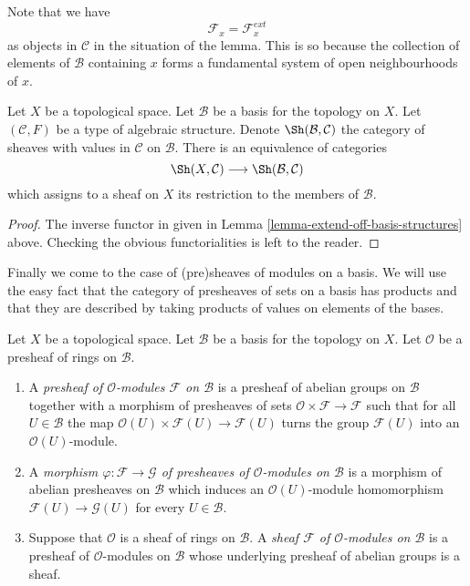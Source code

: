 \noindent
Note that we have
$$
\mathcal{F}_x = \mathcal{F}_x^{ext}
$$
as objects in $\mathcal{C}$
in the situation of the lemma. This is so because the
collection of elements of $\mathcal{B}$ containing
$x$ forms a fundamental system of open neighbourhoods of $x$.

\begin{lemma}
\label{lemma-restrict-basis-equivalence-structures}
Let $X$ be a topological space.
Let $\mathcal{B}$ be a basis for the topology on $X$.
Let $(\mathcal{C}, F)$ be a type of algebraic structure.
Denote $\Sh(\mathcal{B}, \mathcal{C})$ the category of
sheaves with values in $\mathcal{C}$ on $\mathcal{B}$.
There is an equivalence of categories
$$
\Sh(X, \mathcal{C})
\longrightarrow
\Sh(\mathcal{B}, \mathcal{C})
$$
which assigns to a sheaf on $X$ its restriction to
the members of $\mathcal{B}$.
\end{lemma}

\begin{proof}
The inverse functor in given in
Lemma \ref{lemma-extend-off-basis-structures} above.
Checking the obvious functorialities is left to the
reader.
\end{proof}

\noindent
Finally we come to the case of (pre)sheaves of modules
on a basis. We will use the easy fact that the category
of presheaves of sets on a basis has products and that
they are described by taking products of values on
elements of the bases.

\begin{definition}
\label{definition-sheaf-modules-basis}
Let $X$ be a topological space. Let $\mathcal{B}$ be a
basis for the topology on $X$. Let $\mathcal{O}$ be
a presheaf of rings on $\mathcal{B}$.
\begin{enumerate}
\item A {\it presheaf of $\mathcal{O}$-modules $\mathcal{F}$
on $\mathcal{B}$} is a presheaf of abelian groups on
$\mathcal{B}$ together with a morphism of presheaves
of sets $\mathcal{O} \times \mathcal{F} \to \mathcal{F}$
such that for all $U \in \mathcal{B}$ the map
$\mathcal{O}(U) \times \mathcal{F}(U) \to \mathcal{F}(U)$
turns the group $\mathcal{F}(U)$ into an $\mathcal{O}(U)$-module.
\item A {\it morphism $\varphi : \mathcal{F} \to \mathcal{G}$
of presheaves of $\mathcal{O}$-modules on $\mathcal{B}$}
is a morphism of abelian presheaves on $\mathcal{B}$
which induces an $\mathcal{O}(U)$-module homomorphism
$\mathcal{F}(U) \to \mathcal{G}(U)$ for every $U \in \mathcal{B}$.
\item Suppose that $\mathcal{O}$ is a sheaf of rings
on $\mathcal{B}$. A {\it sheaf $\mathcal{F}$ of $\mathcal{O}$-modules
on $\mathcal{B}$} is a presheaf of $\mathcal{O}$-modules
on $\mathcal{B}$ whose underlying presheaf of abelian groups
is a sheaf.
\end{enumerate}
\end{definition}

